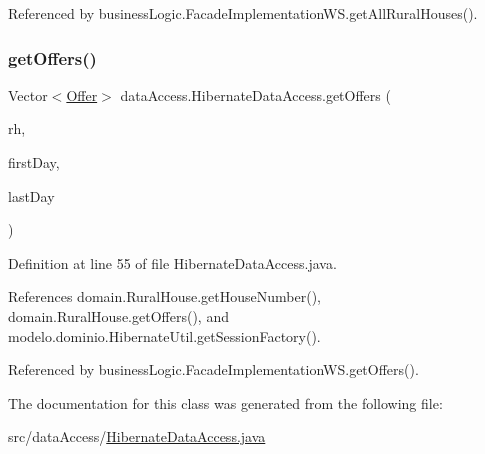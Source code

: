 Referenced by business\+Logic.\+Facade\+Implementation\+W\+S.\+get\+All\+Rural\+Houses().

\mbox{\label{classdataAccess_1_1HibernateDataAccess_a60f1f7e00fb7ccec7fbb799e8a302295}} 
\subsubsection{\texorpdfstring{getOffers()}{getOffers()}}
{\footnotesize\ttfamily Vector$<$\mbox{\hyperlink{classdomain_1_1Offer}{Offer}}$>$ data\+Access.\+Hibernate\+Data\+Access.\+get\+Offers (\begin{DoxyParamCaption}\item[{\mbox{\hyperlink{classdomain_1_1RuralHouse}{Rural\+House}}}]{rh,  }\item[{Date}]{first\+Day,  }\item[{Date}]{last\+Day }\end{DoxyParamCaption})}



Definition at line 55 of file Hibernate\+Data\+Access.\+java.


\begin{DoxyCode}{0}

\end{DoxyCode}


References domain.\+Rural\+House.\+get\+House\+Number(), domain.\+Rural\+House.\+get\+Offers(), and modelo.\+dominio.\+Hibernate\+Util.\+get\+Session\+Factory().



Referenced by business\+Logic.\+Facade\+Implementation\+W\+S.\+get\+Offers().



The documentation for this class was generated from the following file\+:\begin{DoxyCompactItemize}
\item 
src/data\+Access/\mbox{\hyperlink{HibernateDataAccess_8java}{Hibernate\+Data\+Access.\+java}}\end{DoxyCompactItemize}
